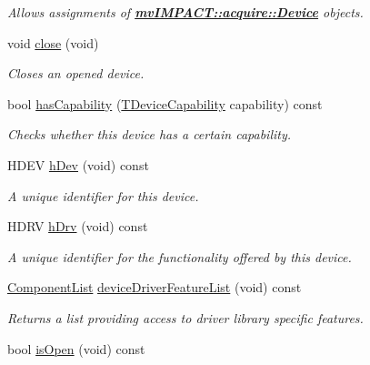 \begin{DoxyCompactItemize}
\begin{DoxyCompactList}\small\item\em Allows assignments of {\bfseries \hyperlink{classmv_i_m_p_a_c_t_1_1acquire_1_1_device}{mv\+I\+M\+P\+A\+C\+T\+::acquire\+::\+Device}} objects. \end{DoxyCompactList}\item 
void \hyperlink{classmv_i_m_p_a_c_t_1_1acquire_1_1_device_a00da7acbf28c1591163682b7bdf611a4}{close} (void)
\begin{DoxyCompactList}\small\item\em Closes an opened device. \end{DoxyCompactList}\item 
bool \hyperlink{classmv_i_m_p_a_c_t_1_1acquire_1_1_device_a1d37b729e39fcb65e29a66cb34c5b78c}{has\+Capability} (\hyperlink{group___common_interface_gab025951bf5eb52c67790e7ecd197b76e}{T\+Device\+Capability} capability) const 
\begin{DoxyCompactList}\small\item\em Checks whether this device has a certain capability. \end{DoxyCompactList}\item 
H\+D\+E\+V \hyperlink{classmv_i_m_p_a_c_t_1_1acquire_1_1_device_a73fb3a8ac92b197700f04e1df9c250e7}{h\+Dev} (void) const 
\begin{DoxyCompactList}\small\item\em A unique identifier for this device. \end{DoxyCompactList}\item 
H\+D\+R\+V \hyperlink{classmv_i_m_p_a_c_t_1_1acquire_1_1_device_a826a7861a74496152b8b56d917ae1dbe}{h\+Drv} (void) const 
\begin{DoxyCompactList}\small\item\em A unique identifier for the functionality offered by this device. \end{DoxyCompactList}\item 
\hyperlink{classmv_i_m_p_a_c_t_1_1acquire_1_1_component_list}{Component\+List} \hyperlink{classmv_i_m_p_a_c_t_1_1acquire_1_1_device_a41a5bc2d37b631bf6b258d9ac64a62b1}{device\+Driver\+Feature\+List} (void) const 
\begin{DoxyCompactList}\small\item\em Returns a list providing access to driver library specific features. \end{DoxyCompactList}\item 
bool \hyperlink{classmv_i_m_p_a_c_t_1_1acquire_1_1_device_a1c8ba8de5814f1034487245ae57840f9}{is\+Open} (void) const 

\end{DoxyCompactItemize}
